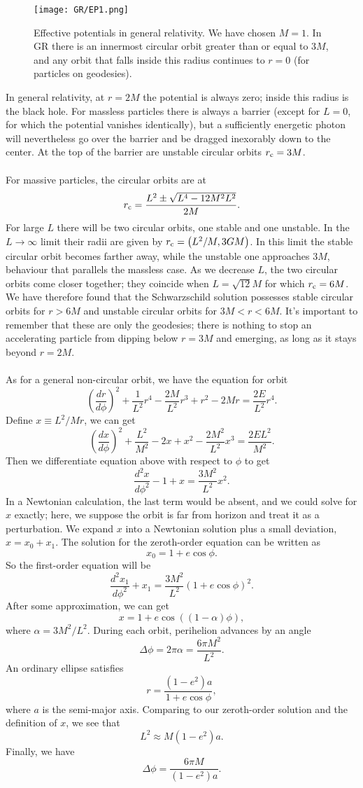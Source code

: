 \begin{figure}
\centering
\texttt{[image: GR/EP1.png]}
\caption{Effective potentials in general relativity. We have chosen $M = 1$. In GR there is an innermost circular orbit greater than or equal to $3M$, and any orbit that falls inside this radius continues to $r = 0$ (for particles on geodesies).}
\end{figure}

\noindent
In general relativity, at $r = 2M$ the potential is always zero; inside this radius is the black hole.
For massless particles there is always a barrier (except for $L = 0$, for which the potential vanishes identically), but a sufficiently energetic photon will  nevertheless go over the barrier and be dragged inexorably down to the center. At the top of the barrier are unstable circular orbits $r_{\rm c} = 3M$.
\\ \\
For massive particles, the circular orbits are at
\[r_{\rm c} = \frac{L^2 \pm \sqrt{L^4-12M^2L^2}}{2M}.\]
For large $L$ there will be two circular orbits, one stable and one unstable. In the $L \to \infty$ limit their radii are given by $r_{\rm c} = \left(L^2/M, 3GM \right)$.
In this limit the stable circular orbit becomes farther away, while the unstable one approaches $3M$, behaviour that parallels the massless case. As we decrease $L$,
the two circular orbits come closer together; they coincide when $L = \sqrt{12}M$ for which $r_{\rm c} = 6M$. We have therefore found that the Schwarzschild solution possesses stable circular orbits for $r > 6M$ and unstable circular orbits for $3M < r < 6M$. 
It's important to remember that these are only the geodesies; there is nothing to stop an accelerating particle from dipping below $r = 3M$ and emerging, as long as it stays beyond $r = 2M$.
\\ \\
As for a general non-circular orbit, we have the equation for orbit
\[\left(\frac{dr}{d\phi}\right)^2 + \frac{1}{L^2}r^4 - \frac{2M}{L^2}r^3 + r^2 - 2Mr = \frac{2E}{L^2}r^4. \] 
Define $x \equiv L^2/Mr$, we can get
\[\left(\frac{dx}{d\phi}\right)^2 + \frac{L^2}{M^2} - 2x + x^2 - \frac{2M^2}{L^2}x^3 = \frac{2EL^2}{M^2}. \]
Then we differentiate equation above with respect to $\phi$ to get
\[\frac{d^2x}{d\phi^2} - 1 + x = \frac{3M^2}{L^2}x^2.\]
In a Newtonian calculation, the last term would be absent, and we could solve for $x$ exactly; here, we suppose the orbit is far from horizon and treat it as a perturbation.
We expand $x$ into a Newtonian solution plus a small deviation, $x = x_0 + x_1$. The solution for the zeroth-order equation can be written as
\[x_0 = 1 + e\cos\phi.\]
So the first-order equation will be
\[\frac{d^2x_1}{d\phi^2} + x_1 = \frac{3M^2}{L^2}(1+e\cos\phi)^2.\]
After some approximation, we can get
\[x = 1 + e\cos((1-\alpha)\phi),\]
where $\alpha = 3M^2/L^2$. During each orbit, perihelion 
advances by an angle
\[\Delta \phi = 2\pi \alpha = \frac{6\pi M^2}{L^2}.\]
An ordinary ellipse satisfies
\[r = \frac{(1-e^2)a}{1+e\cos\phi},\]
where $a$ is the semi-major axis. Comparing to our zeroth-order solution and the definition of $x$, we see that
\[L^2 \approx M(1-e^2)a.\]
Finally, we have
\[\Delta \phi = \frac{6\pi M}{(1-e^2)a}.\]

